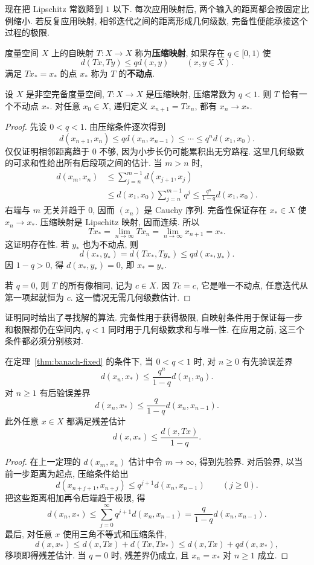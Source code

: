 现在把 Lipschitz 常数降到 $1$ 以下. 每次应用映射后, 两个输入的距离都会按固定比例缩小. 若反复应用映射, 相邻迭代之间的距离形成几何级数, 完备性便能承接这个过程的极限.

\begin{definition}\label{def:contraction}
度量空间 $X$ 上的自映射 $T:X\to X$ 称为\textbf{压缩映射}, 如果存在 $q\in[0,1)$ 使
\[
d(Tx,Ty)\leq qd(x,y)\qquad(x,y\in X).
\]
满足 $Tx_*=x_*$ 的点 $x_*$ 称为 $T$ 的\textbf{不动点}.
\end{definition}

\begin{theorem}\label{thm:banach-fixed}
设 $X$ 是非空完备度量空间, $T:X\to X$ 是压缩映射, 压缩常数为 $q<1$. 则 $T$ 恰有一个不动点 $x_*$. 对任意 $x_0\in X$, 递归定义 $x_{n+1}=Tx_n$, 都有 $x_n\to x_*$.
\end{theorem}
\begin{proof}
先设 $0<q<1$. 由压缩条件逐次得到
\[
d(x_{n+1},x_n)\leq qd(x_n,x_{n-1})
\leq\cdots\leq q^nd(x_1,x_0).
\]
仅仅证明相邻距离趋于 $0$ 不够, 因为小步长仍可能累积出无穷路程. 这里几何级数的可求和性给出所有后段项之间的估计. 当 $m>n$ 时,
\begin{align*}
d(x_m,x_n)
&\leq\sum_{j=n}^{m-1}d(x_{j+1},x_j)\\
&\leq d(x_1,x_0)\sum_{j=n}^{m-1}q^j
\leq\frac{q^n}{1-q}d(x_1,x_0).
\end{align*}
右端与 $m$ 无关并趋于 $0$, 因而 $(x_n)$ 是 Cauchy 序列. 完备性保证存在 $x_*\in X$ 使 $x_n\to x_*$. 压缩映射是 Lipschitz 映射, 因而连续. 所以
\[
Tx_*=\lim_{n\to\infty}Tx_n
=\lim_{n\to\infty}x_{n+1}=x_*.
\]
这证明存在性. 若 $y_*$ 也为不动点, 则
\[
d(x_*,y_*)=d(Tx_*,Ty_*)\leq qd(x_*,y_*).
\]
因 $1-q>0$, 得 $d(x_*,y_*)=0$, 即 $x_*=y_*$.

若 $q=0$, 则 $T$ 的所有像相同, 记为 $c\in X$. 因 $Tc=c$, 它是唯一不动点, 任意迭代从第一项起就恒为 $c$. 这一情况无需几何级数估计.
\end{proof}

证明同时给出了寻找解的算法. 完备性用于获得极限, 自映射条件用于保证每一步和极限都仍在空间内, $q<1$ 同时用于几何级数求和与唯一性. 在应用之前, 这三个条件都必须分别核对.

\begin{proposition}[迭代误差界]\label{prop:banach-error}
在定理~\ref{thm:banach-fixed} 的条件下, 当 $0<q<1$ 时, 对 $n\geq0$ 有先验误差界
\[
d(x_n,x_*)\leq\frac{q^n}{1-q}d(x_1,x_0).
\]
对 $n\geq1$ 有后验误差界
\[
d(x_n,x_*)\leq\frac{q}{1-q}d(x_n,x_{n-1}).
\]
此外任意 $x\in X$ 都满足残差估计
\[
d(x,x_*)\leq\frac{d(x,Tx)}{1-q}.
\]
\end{proposition}
\begin{proof}
在上一定理的 $d(x_m,x_n)$ 估计中令 $m\to\infty$, 得到先验界. 对后验界, 以当前一步距离为起点, 压缩条件给出
\[
d(x_{n+j+1},x_{n+j})\leq q^{j+1}d(x_n,x_{n-1})
\qquad(j\geq0).
\]
把这些距离相加再令后端趋于极限, 得
\[
d(x_n,x_*)\leq\sum_{j=0}^{\infty}q^{j+1}d(x_n,x_{n-1})
=\frac{q}{1-q}d(x_n,x_{n-1}).
\]
最后, 对任意 $x$ 使用三角不等式和压缩条件,
\[
d(x,x_*)\leq d(x,Tx)+d(Tx,Tx_*)
\leq d(x,Tx)+qd(x,x_*),
\]
移项即得残差估计. 当 $q=0$ 时, 残差界仍成立, 且 $x_n=x_*$ 对 $n\geq1$ 成立.
\end{proof}

